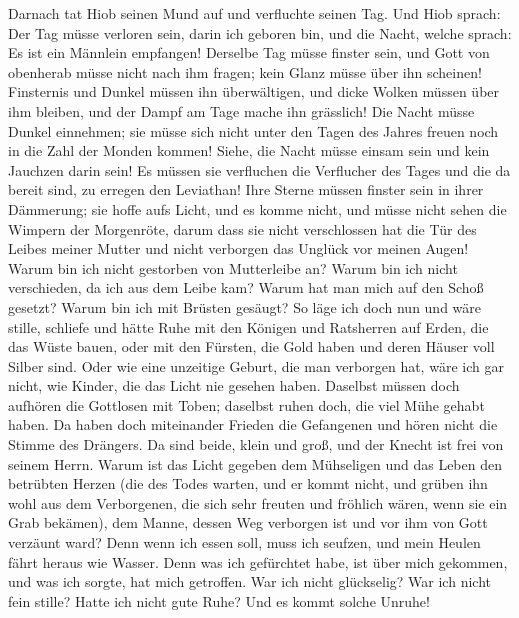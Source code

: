  Darnach tat Hiob seinen Mund auf und verfluchte seinen
Tag.  Und Hiob sprach:  Der Tag müsse
verloren sein, darin ich geboren bin, und die Nacht, welche sprach: Es
ist ein Männlein empfangen!  Derselbe Tag müsse finster
sein, und Gott von obenherab müsse nicht nach ihm fragen; kein Glanz
müsse über ihn scheinen!  Finsternis und Dunkel müssen ihn
überwältigen, und dicke Wolken müssen über ihm bleiben, und der Dampf am
Tage mache ihn grässlich!  Die Nacht müsse Dunkel
einnehmen; sie müsse sich nicht unter den Tagen des Jahres freuen noch
in die Zahl der Monden kommen!  Siehe, die Nacht müsse
einsam sein und kein Jauchzen darin sein!  Es müssen sie
verfluchen die Verflucher des Tages und die da bereit sind, zu erregen
den Leviathan!  Ihre Sterne müssen finster sein in ihrer
Dämmerung; sie hoffe aufs Licht, und es komme nicht, und müsse nicht
sehen die Wimpern der Morgenröte,  darum dass sie nicht
verschlossen hat die Tür des Leibes meiner Mutter und nicht verborgen
das Unglück vor meinen Augen!  Warum bin ich nicht
gestorben von Mutterleibe an? Warum bin ich nicht verschieden, da ich
aus dem Leibe kam?  Warum hat man mich auf den Schoß
gesetzt? Warum bin ich mit Brüsten gesäugt?  So läge ich
doch nun und wäre stille, schliefe und hätte Ruhe  mit
den Königen und Ratsherren auf Erden, die das Wüste bauen,
 oder mit den Fürsten, die Gold haben und deren Häuser
voll Silber sind.  Oder wie eine unzeitige Geburt, die
man verborgen hat, wäre ich gar nicht, wie Kinder, die das Licht nie
gesehen haben.  Daselbst müssen doch aufhören die
Gottlosen mit Toben; daselbst ruhen doch, die viel Mühe gehabt haben.
 Da haben doch miteinander Frieden die Gefangenen und
hören nicht die Stimme des Drängers.  Da sind beide,
klein und groß, und der Knecht ist frei von seinem Herrn.
 Warum ist das Licht gegeben dem Mühseligen und das Leben
den betrübten Herzen  (die des Todes warten, und er kommt
nicht, und grüben ihn wohl aus dem Verborgenen,  die sich
sehr freuten und fröhlich wären, wenn sie ein Grab bekämen),
 dem Manne, dessen Weg verborgen ist und vor ihm von Gott
verzäunt ward?  Denn wenn ich essen soll, muss ich
seufzen, und mein Heulen fährt heraus wie Wasser.  Denn
was ich gefürchtet habe, ist über mich gekommen, und was ich sorgte, hat
mich getroffen.  War ich nicht glückselig? War ich nicht
fein stille? Hatte ich nicht gute Ruhe? Und es kommt solche Unruhe!

